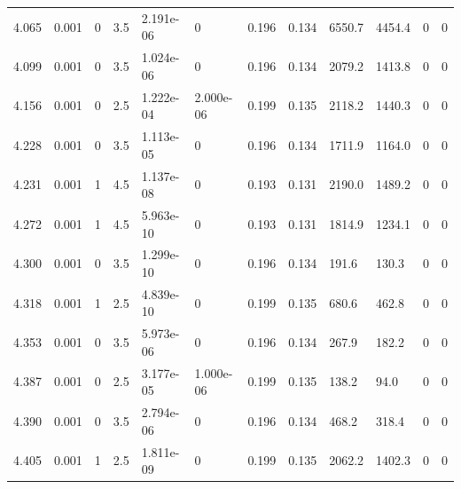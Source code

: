 \documentclass[preview]{standalone}
\begin{document}
{{{{\begin{tabular}{L{1.2cm}C{1.2cm} C{0.3cm}C{0.5cm} C{1.4cm}C{1.4cm} C{1.4cm}C{1.4cm} C{1.6cm}C{1.6cm} C{1.6cm}C{1.6cm}}
  4.065  &  0.001  & 0     & 3.5 &  2.191e-06  & 0  &  0.196&   0.134& 6550.7 & 4454.4   &  0 & 0  \\ 
  4.099  &  0.001  & 0     & 3.5 &  1.024e-06  & 0  &  0.196&   0.134& 2079.2 & 1413.8   &  0 & 0  \\ 
  4.156  &  0.001  & 0     & 2.5 &  1.222e-04  & 2.000e-06  &  0.199&   0.135& 2118.2 & 1440.3   &  0 & 0  \\ 
  4.228  &  0.001  & 0     & 3.5 &  1.113e-05  & 0  &  0.196&   0.134& 1711.9 & 1164.0   &  0 & 0  \\ 
  4.231  &  0.001  & 1     & 4.5 &  1.137e-08  & 0  &  0.193&   0.131& 2190.0 & 1489.2   &  0 & 0  \\ 
  4.272  &  0.001  & 1     & 4.5 &  5.963e-10  & 0  &  0.193&   0.131& 1814.9 & 1234.1   &  0 & 0  \\ 
  4.300  &  0.001  & 0     & 3.5 &  1.299e-10  & 0  &  0.196&   0.134& 191.6 & 130.3   &  0 & 0  \\ 
  4.318  &  0.001  & 1     & 2.5 &  4.839e-10  & 0  &  0.199&   0.135& 680.6 & 462.8   &  0 & 0  \\ 
  4.353  &  0.001  & 0     & 3.5 &  5.973e-06  & 0  &  0.196&   0.134& 267.9 & 182.2   &  0 & 0  \\ 
  4.387  &  0.001  & 0     & 2.5 &  3.177e-05  & 1.000e-06  &  0.199&   0.135& 138.2 & 94.0   &  0 & 0  \\ 
  4.390  &  0.001  & 0     & 3.5 &  2.794e-06  & 0  &  0.196&   0.134& 468.2 & 318.4   &  0 & 0  \\ 
  4.405  &  0.001  & 1     & 2.5 &  1.811e-09  & 0  &  0.199&   0.135& 2062.2 & 1402.3   &  0 & 0  \\ 
\hline 
\end{tabular} 

}}}}
\end{document}

